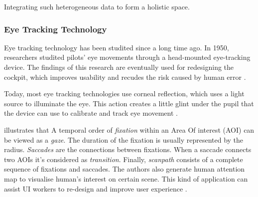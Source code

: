 

Integrating such heterogeneous data to form a holistic space.

\subsubsection{Eye Tracking Technology}


Eye tracking technology has been studited since a long time ago. In 1950, researchers studited pilots' eye movements through a head-mounted eye-tracking device. The findings of this research are eventually used for redesigning the cockpit, which improves usability and recudes the risk caused by human error \citep{Fitts2005Cockpit, Cooke2005EyeTrackingUsability}.

Today, most eye tracking technologies use corneal reflection, which uses a light source to illuminate the eye. This action creates a little glint under the pupil that the device can use to calibrate and track eye movement \citep{Schall2014EyeTrackingIntro, Fitts2005Cockpit}.

\citet{Blascheck2014VisualisingEyeTracking} illustrates that A temporal order of \textit{fixation} within an Area Of interest (AOI) can be viewed as a \textit{gaze}. The duration of the fixation is usually represented by the radius. \textit{Saccades} are the connections between fixations. When a saccade connects two AOIs it's considered as  \textit{transition}. Finally, \textit{scanpath} consists of a complete sequence of fixations and saccades. The authors also generate human attention map to visualise human's interest on certain scene. This kind of application can assist UI workers to re-design and improve user experience \citep{Schall2014EyeTrackingIntro}.

